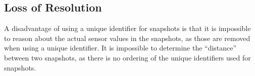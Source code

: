 \subsection{Loss of Resolution}
A disadvantage of using a unique identifier for snapshots is that it is impossible to reason about the actual sensor values in the snapshots, as those are removed when using a unique identifier. It is impossible to determine the \enquote{distance} between two snapshots, as there is no ordering of the unique identifiers used for snapshots.